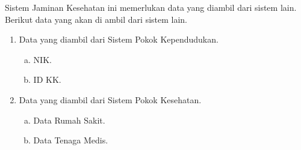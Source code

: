 Sistem Jaminan Kesehatan ini memerlukan data yang diambil dari sistem lain. Berikut data yang akan di ambil dari sistem lain.
\begin{enumerate}[1.]
	\item Data yang diambil dari Sistem Pokok Kependudukan. 
	\begin{enumerate}[a.]
		\item NIK.
		\item ID KK.
	\end{enumerate}
	\item Data yang diambil dari Sistem Pokok Kesehatan.
	\begin{enumerate}[a.]
		\item Data Rumah Sakit.
		\item Data Tenaga Medis.
	\end{enumerate}
\end{enumerate}